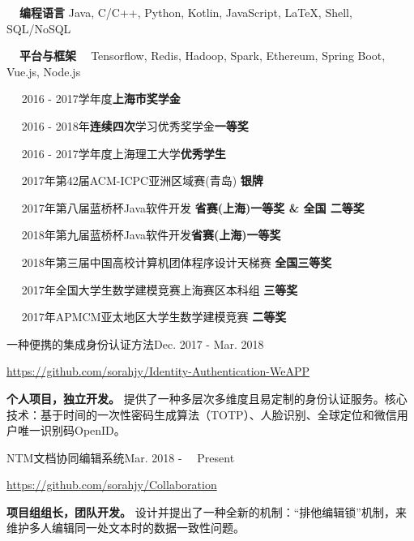 \documentclass{sorahjy_cv}
\begin{document}
%
%

\begin{description}{}
	\item{\textbf{\ \ 编程语言 \quad }} Java, C/C++, Python, Kotlin, JavaScript, \LaTeX, Shell, SQL/NoSQL
	\item{\textbf{\ \ 平台与框架 \ }} Tensorflow, Redis, Hadoop, Spark, Ethereum, Spring Boot, Vue.js, Node.js 
\end{description}


%
%

\begin{description}{}
	\item{\ \ } 2016 - 2017学年度\textbf{上海市奖学金}
	\item{\ \ } 2016 - 2018年\textbf{连续四次}学习优秀奖学金\textbf{一等奖}
	\item{\ \ } 2016 - 2017学年度上海理工大学\textbf{优秀学生}
	\item{\ \ } 2017年第42届ACM-ICPC亚洲区域赛(青岛) \hfill \textbf{银牌}
	\item{\ \ } 2017年第八届蓝桥杯Java软件开发 \hfill \textbf{省赛(上海)一等奖 \& 全国 二等奖}
	\item{\ \ } 2018年第九届蓝桥杯Java软件开发\hfill \textbf{省赛(上海)一等奖}
	\item{\ \ } 2018年第三届中国高校计算机团体程序设计天梯赛 \hfill \textbf{全国三等奖}
	\item{\ \ } 2017年全国大学生数学建模竞赛上海赛区本科组 \hfill \textbf{三等奖}
	\item{\ \ } 2017年APMCM亚太地区大学生数学建模竞赛 \hfill \textbf{二等奖}

\end{description}


%
%


\begin{sectionContentSimple}{一种便携的集成身份认证方法}{Dec. 2017 - Mar. 2018}
	\item \url{https://github.com/sorahjy/Identity-Authentication-WeAPP}
	\item \textbf{个人项目，独立开发。} 提供了一种多层次多维度且易定制的身份认证服务。核心技术：基于时间的一次性密码生成算法（TOTP）、人脸识别、全球定位和微信用户唯一识别码OpenID。
\end{sectionContentSimple}

\begin{sectionContentSimple}{NTM文档协同编辑系统}{Mar. 2018 - \ \ Present \ }
	\item \url{https://github.com/sorahjy/Collaboration}
	\item \textbf{项目组组长，团队开发。} 设计并提出了一种全新的机制：“排他编辑锁”机制，来维护多人编辑同一处文本时的数据一致性问题。
\end{sectionContentSimple}
\end{document}
